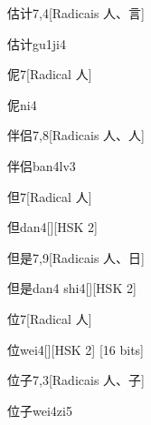 \begin{entry}{估计}{7,4}[Radicais ⼈、⾔]
  \begin{phonetics}{估计}{gu1ji4}
  \end{phonetics}
\end{entry}

\begin{entry}{伲}{7}[Radical ⼈]
  \begin{phonetics}{伲}{ni4}
  \end{phonetics}
\end{entry}

\begin{entry}{伴侣}{7,8}[Radicais ⼈、⼈]
  \begin{phonetics}{伴侣}{ban4lv3}
  \end{phonetics}
\end{entry}

\begin{entry}{但}{7}[Radical ⼈]
  \begin{phonetics}{但}{dan4}[][HSK 2]
  \end{phonetics}
\end{entry}

\begin{entry}{但是}{7,9}[Radicais ⼈、⽇]
  \begin{phonetics}{但是}{dan4 shi4}[][HSK 2]
  \end{phonetics}
\end{entry}

\begin{entry}{位}{7}[Radical ⼈]
  \begin{phonetics}{位}{wei4}[][HSK 2]
    [16 bits]
  \end{phonetics}
\end{entry}

\begin{entry}{位子}{7,3}[Radicais ⼈、⼦]
  \begin{phonetics}{位子}{wei4zi5}
  \end{phonetics}
\end{entry}

